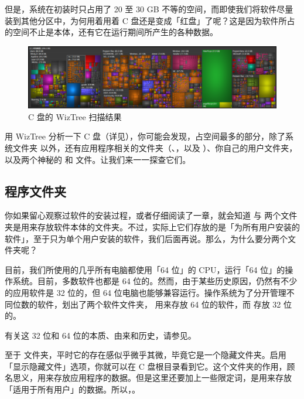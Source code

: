 但是，系统在初装时只占用了 20 至 30 GB 不等的空间，而即使我们将软件尽量装到其他分区中，为何用着用着 C 盘还是变成「红盘」了呢？这是因为软件所占的空间不止是本体，还有它在运行期间所产生的各种数据。

\begin{figure}[htb!]
  \centering
  \includegraphics[width=.8\textwidth]{assets/advanced/Scan_C_Drive.png}
  \caption{C 盘的 WizTree 扫描结果}
  \label{fig:Scan_C_Drive}
\end{figure}

用 WizTree 分析一下 C 盘（详见），你可能会发现，占空间最多的部分，除了系统文件夹  以外，还有应用程序相关的文件夹（、，以及 ）、你自己的用户文件夹，以及两个神秘的  和  文件。让我们来一一探查它们。

\subsection{程序文件夹}

你如果留心观察过软件的安装过程，或者仔细阅读了一章，就会知道  与  两个文件夹是用来存放软件本体的文件夹。不过，实际上它们存放的是「为所有用户安装的软件」，至于只为单个用户安装的软件，我们后面再说。那么，为什么要分两个文件夹呢？

目前，我们所使用的几乎所有电脑都使用「64 位」的 CPU，运行「64 位」的操作系统。目前，多数软件也都是 64 位的。然而，由于某些历史原因，仍然有不少的应用软件是 32 位的，但 64 位电脑也能够兼容运行。操作系统为了分开管理不同位数的软件，划出了两个软件文件夹， 用来存放 64 位的软件，而  存放 32 位的。

\begin{note}
  有关这 32 位和 64 位的本质、由来和历史，请参见。
\end{note}

至于  文件夹，平时它的存在感似乎微乎其微，毕竟它是一个隐藏文件夹。启用「显示隐藏文件」选项，你就可以在 C 盘根目录看到它。这个文件夹的作用，顾名思义，用来存放应用程序的数据。但是这里还要加上一些限定词，是用来存放「适用于所有用户」的数据。所以，。

